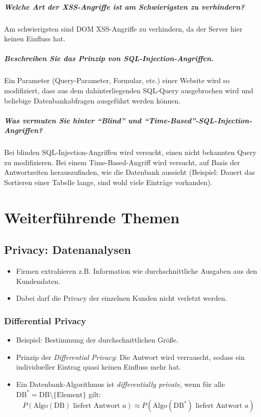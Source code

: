 \paragraph{Welche Art der XSS-Angriffe ist am Schwierigsten zu verhindern?}
Am schwierigsten sind DOM XSS-Angriffe zu verhindern, da der Server hier keinen Einfluss hat.

\paragraph{Beschreiben Sie das Prinzip von SQL-Injection-Angriffen.}
	Ein Parameter (Query-Parameter, Formular, etc.) einer Website wird so modifiziert, dass aus dem dahinterliegenden SQL-Query ausgebrochen wird und beliebige Datenbankabfragen ausgeführt werden können.

	\paragraph{Was vermuten Sie hinter \enquote{Blind} und \enquote{Time-Based}-SQL-Injection-Angriffen?}
		Bei blinden SQL-Injection-Angriffen wird versucht, einen nicht bekannten Query zu modifizieren. Bei einem Time-Based-Angriff wird versucht, auf Basis der Antwortzeiten herauszufinden, wie die Datenbank aussieht (Beispiel: Dauert das Sortieren einer Tabelle lange, sind wohl viele Einträge vorhanden).

\chapter{Weiterführende Themen}
	\section{Privacy: Datenanalysen}
		\begin{itemize}
			\item Firmen extrahieren z.B. Information wie durchschnittliche Ausgaben aus den Kundendaten.
			\item Dabei darf die Privacy der einzelnen Kunden nicht verletzt werden.
		\end{itemize}

		\subsection{Differential Privacy}
			\begin{itemize}
				\item Beispiel: Bestimmung der durchschnittlichen Größe.
				\item Prinzip der \textit{Differential Privacy}: Die Antwort wird verrauscht, sodass ein individueller Eintrag quasi keinen Einfluss mehr hat.
				\item Ein Datenbank-Algorithmus ist \textit{differentially private}, wenn für alle \( \textrm{DB}^* = \textrm{DB} \setminus \{ \textrm{Element} \} \) gilt:
					\begin{equation*}
						P(\textrm{Algo}(\textrm{DB}) \textrm{ liefert Antwort } a) \approx P(\textrm{Algo}(\textrm{DB}^*) \textrm{ liefert Antwort } a)
					\end{equation*}
			\end{itemize}

